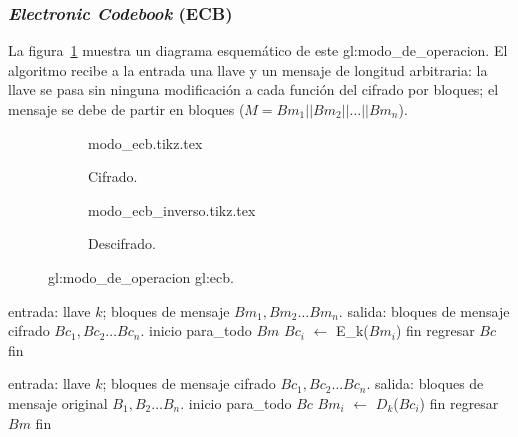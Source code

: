 %
%

\subsubsection{\textit{Electronic Codebook} (ECB)}

La figura~\ref{figura:ecb} muestra un diagrama esquemático de este
\gls{gl:modo_de_operacion}. El algoritmo recibe a la entrada una llave y un
mensaje de longitud arbitraria: la llave se pasa sin ninguna modificación a
cada función del cifrado por bloques; el mensaje se debe de partir en bloques
($ M = Bm_1 || Bm_2 || \dots || Bm_n $).

\begin{figure}
  \centering
  \begin{subfigure}{0.45\textwidth}
    \begin{center}
      {modo_ecb.tikz.tex}
      \caption{Cifrado.}
    \end{center}
  \end{subfigure}
  \begin{subfigure}{0.45\textwidth}
    \begin{center}
      {modo_ecb_inverso.tikz.tex}
      \caption{Descifrado.}
    \end{center}
  \end{subfigure}
  \caption{\Gls{gl:modo_de_operacion} \gls{gl:ecb}.}
  \label{figura:ecb}
\end{figure}

\begin{pseudocodigo}[%
    caption={\Gls{gl:modo_de_operacion} \gls{gl:ecb}, cifrado.}%
  ]
    entrada: llave $ k $; bloques de mensaje $ Bm_1, Bm_2 \dots Bm_n $.
    salida:  bloques de mensaje cifrado $ Bc_1, Bc_2 \dots Bc_n $.
    inicio
      para_todo $Bm$
        $Bc_i$ $\gets$ E_k($Bm_i$)
      fin
      regresar $Bc$
    fin
\end{pseudocodigo}

\begin{pseudocodigo}[%
    caption={\Gls{gl:modo_de_operacion} \gls{gl:ecb}, descifrado.}%
  ]
    entrada: llave $ k $; bloques de mensaje cifrado $ Bc_1, Bc_2 \dots Bc_n $.
    salida:  bloques de mensaje original $ B_1, B_2 \dots B_n $.
    inicio
      para_todo $Bc$
        $Bm_i$ $\gets$ $D_k$($Bc_i$)
      fin
      regresar $Bm$
    fin
\end{pseudocodigo}
